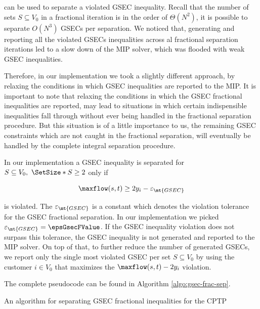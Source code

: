 can be used to separate a violated GSEC inequality.
Recall that the number of sets $S \subseteq V_0$ in a fractional iteration is in the order of $\Theta(N^2)$, it is possible to separate $O(N^3)$ GSECs per separation.
We noticed that, generating and reporting all the violated GSECs inequalities across al fractional separation iterations led to a slow down of the MIP solver, which was flooded with weak GSEC inequalities.

Therefore, in our implementation we took a slightly different approach, by relaxing the conditions in which GSEC inequalities are reported to the MIP.
It is important to note that relaxing the conditions in which the GSEC fractional inequalities are reported, may lead to situations in which certain indispensible inequalities fall through without ever being handled in the fractional separation procedure.
But this situation is of a little importance to us, the remaining GSEC constraints which are not caught in the fractional separation, will eventually be handled by the complete integral separation procedure.

In our implementation a GSEC inequality is separated for $S \subseteq V_0,\ \SetSize*{S} \ge 2$ only if

\begin{equation}
	\maxflow(s, t) \ge 2 y_i - \varepsilon_{\mt{GSEC}}
\end{equation}

is violated.
The $\varepsilon_{\mt{GSEC}}$ is a constant which denotes the violation tolerance for the GSEC fractional separation.
In our implementation we picked $\varepsilon_{\mt{GSEC}} = \epsGsecFValue$.
If the GSEC inequality violation does not surpass this tolerance, the GSEC inequality is not generated and reported to the MIP solver.
On top of that, to further reduce the number of generated GSECs, we report only the single most violated GSEC per set $S \subseteq V_0$ by using the customer $i \in V_0$ that maximizes the $\maxflow(s, t) - 2 y_i$ violation.

The complete pseudocode can be found in Algorithm \ref{algo:gsec-frac-sep}.

\begin{algorithm}
	\caption{An algorithm for separating GSEC fractional inequalities for the CPTP}
	\label{algo:gsec-frac-sep}
	
\end{algorithm}

